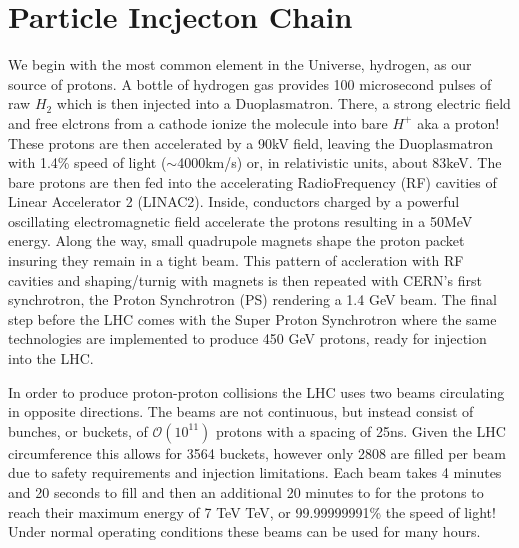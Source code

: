 \section{Particle Incjecton Chain} \label{sec:lhc:injection}

We begin with the most common element in the Universe, hydrogen, as our source
of protons.  A bottle of hydrogen gas provides 100 microsecond pulses of raw
$H_{2}$ which is then injected into a Duoplasmatron. There,  a strong electric
field and free elctrons from a cathode ionize the molecule into bare $H^{+}$ aka
a proton!  These protons are then accelerated by a 90kV field, leaving the
Duoplasmatron with 1.4\% speed of light ($\sim$4000km/s) or, in relativistic
units, about 83keV. The bare protons are then fed into the accelerating
RadioFrequency (RF) cavities of Linear Accelerator 2 (LINAC2). Inside,
conductors charged by a powerful oscillating electromagnetic field accelerate
the protons resulting in a 50MeV energy. Along the way, small quadrupole magnets
shape the proton packet insuring they remain in a tight beam.  This pattern of
accleration with RF cavities and shaping/turnig with magnets is then repeated
with CERN's first synchrotron, the Proton Synchrotron (PS) rendering a 1.4 GeV
beam.  The final step before the LHC comes with the Super Proton Synchrotron
where the same technologies are implemented to produce 450 GeV protons, ready
for injection into the LHC. 

In order to produce proton-proton collisions the LHC uses two beams circulating
in opposite directions.  The beams are not continuous, but instead consist of
bunches, or buckets, of $\mathcal{O}(10^{11})$ protons with a spacing of 25ns.
Given the LHC circumference this allows for 3564 buckets, however only 2808 are
filled per beam due to safety requirements and injection limitations.  Each beam
takes 4 minutes and 20 seconds to fill and then an additional 20 minutes to for
the protons to reach their maximum energy of 7 TeV TeV, or 99.99999991\% the
speed of light! Under normal operating conditions these beams can be used for
many hours.
